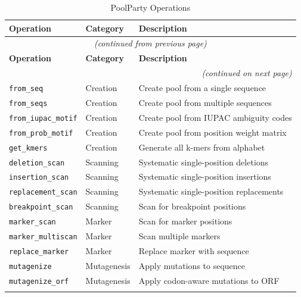 \documentclass[11pt]{article}
\begin{document}
\begin{longtable}{@{}llp{7cm}@{}}
\caption{PoolParty Operations} \label{tab:poolparty-ops} \\
\toprule
\textbf{Operation} & \textbf{Category} & \textbf{Description} \\
\midrule
\endfirsthead
\multicolumn{3}{c}{\textit{(continued from previous page)}} \\
\toprule
\textbf{Operation} & \textbf{Category} & \textbf{Description} \\
\midrule
\endhead
\midrule
\multicolumn{3}{r}{\textit{(continued on next page)}} \\
\endfoot
\bottomrule
\endlastfoot

\texttt{from_seq} & Creation & Create pool from a single sequence \\
\texttt{from_seqs} & Creation & Create pool from multiple sequences \\
\texttt{from_iupac_motif} & Creation & Create pool from IUPAC ambiguity codes \\
\texttt{from_prob_motif} & Creation & Create pool from position weight matrix \\
\texttt{get_kmers} & Creation & Generate all k-mers from alphabet \\
\addlinespace

\texttt{deletion_scan} & Scanning & Systematic single-position deletions \\
\texttt{insertion_scan} & Scanning & Systematic single-position insertions \\
\texttt{replacement_scan} & Scanning & Systematic single-position replacements \\
\texttt{breakpoint_scan} & Scanning & Scan for breakpoint positions \\
\addlinespace

\texttt{marker_scan} & Marker & Scan for marker positions \\
\texttt{marker_multiscan} & Marker & Scan multiple markers \\
\texttt{replace_marker} & Marker & Replace marker with sequence \\
\addlinespace

\texttt{mutagenize} & Mutagenesis & Apply mutations to sequence \\
\texttt{mutagenize_orf} & Mutagenesis & Apply codon-aware mutations to ORF \\
\addlinespace


\end{longtable}
\end{document}
